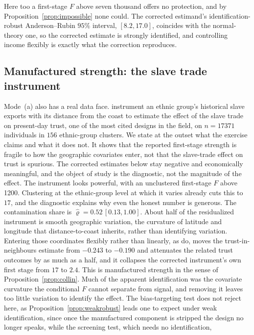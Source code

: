 \documentclass[preprint,11pt,authoryear]{elsarticle}
\theoremstyle{definition}
\begin{document}
Here too a first-stage $F$ above seven thousand offers no protection, and by
Proposition~\ref{prop:impossible} none could. The corrected estimand's
identification-robust Anderson--Rubin $95\%$ interval, $[8.2,17.0]$, coincides with the
normal-theory one, so the corrected estimate is strongly identified, and controlling
income flexibly is exactly what the correction reproduces.

\subsection{Manufactured strength: the slave trade instrument}\label{sec:nw}

Mode~(a) also has a real data face. \citet{nunn2011} instrument an ethnic group's
historical slave exports with its distance from the coast to estimate the effect of the
slave trade on present-day trust, one of the most cited designs in the field, on
$n=\num{17371}$ individuals in $156$ ethnic-group clusters. We state at the outset what
the exercise claims and what it does not. It shows that the reported first-stage strength
is fragile to how the geographic covariates enter, not that the slave-trade effect on
trust is spurious. The corrected estimates below stay negative and economically
meaningful, and the object of study is the diagnostic, not the magnitude of the effect.
The instrument looks powerful, with an unclustered first-stage $F$ above \num{1200}. Clustering at the
ethnic-group level at which it varies already cuts this to $17$, and the diagnostic
explains why even the honest number is generous. The contamination share is
$\hat\varrho=0.52\,[0.13,1.00]$. About half of the residualized instrument is smooth
geographic variation, the curvature of latitude and longitude that distance-to-coast
inherits, rather than identifying variation. Entering those coordinates flexibly rather
than linearly, as \citet{nunn2011} do, moves the trust-in-neighbours estimate from
$-0.243$ to $-0.190$ and attenuates the related trust outcomes by as much as a half,
and it collapses the corrected instrument's own first stage from $17$ to $2.4$. This is
manufactured strength in the sense of Proposition~\ref{prop:collin}. Much of the
apparent identification was the covariate curvature the conditional $F$ cannot separate
from signal, and removing it leaves too little variation to identify the effect. The
bias-targeting test does not reject here, as Proposition~\ref{prop:weakrobust} leads one
to expect under weak identification, since once the manufactured component is stripped
the design no longer speaks, while the screening test, which needs no identification,
\end{document}

